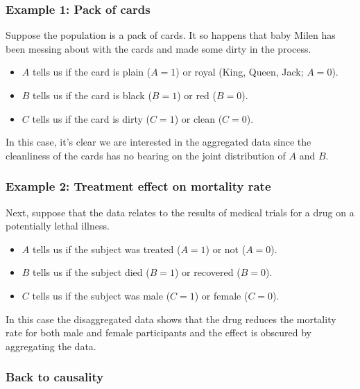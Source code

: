 \subsubsection*{Example 1: Pack of cards}

Suppose the population is a pack of cards. It so happens that baby Milen has been messing about with the cards and made some dirty in the process.
\begin{itemize}
\item $A$ tells us if the card is plain ($A=1$) or royal (King, Queen, Jack; $A=0$).
\item $B$ tells us if the card is black ($B=1$) or red ($B=0$).
\item $C$ tells us if the card is dirty ($C=1$) or clean ($C=0$).
\end{itemize}
In this case, it's clear we are interested in the aggregated data since the cleanliness of the cards has no bearing on the joint distribution of $A$ and $B$.

\subsubsection*{Example 2: Treatment effect on mortality rate}

Next, suppose that the data relates to the results of medical trials for a drug on a potentially lethal illness.
\begin{itemize}
\item $A$ tells us if the subject was treated ($A=1$) or not ($A=0$).
\item $B$ tells us if the subject died ($B=1$) or recovered ($B=0$).
\item $C$ tells us if the subject was male ($C=1$) or female ($C=0$).
\end{itemize}
In this case the disaggregated data shows that the drug reduces the mortality rate for both male and female participants and the effect is obscured by aggregating the data.

\subsubsection*{Back to causality}

